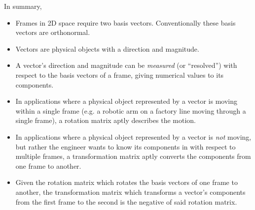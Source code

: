 In summary,
\begin{itemize}
    \item Frames in 2D space require two basis vectors. Conventionally these
          basis vectors are orthonormal.
    \item Vectors are physical objects with a direction and magnitude.
    \item A vector's direction and magnitude can be \textit{measured}
          (or ``resolved'') with respect to the basis vectors of a frame,
          giving numerical values to its components.
    \item In applications where a physical object represented by a vector is
          moving within a single frame (e.g. a robotic arm on a factory line
          moving through a single frame), a rotation matrix aptly describes
          the motion.
    \item In applications where a physical object represented by a vector is
          \textit{not} moving, but rather the engineer wants to know its
          components in with respect to multiple frames, a transformation
          matrix aptly converts the components from one frame to another.
    \item Given the rotation matrix which rotates the basis vectors of one
          frame to another, the transformation matrix which transforms a
          vector's components from the first frame to the second is the
          negative of said rotation matrix.
\end{itemize}